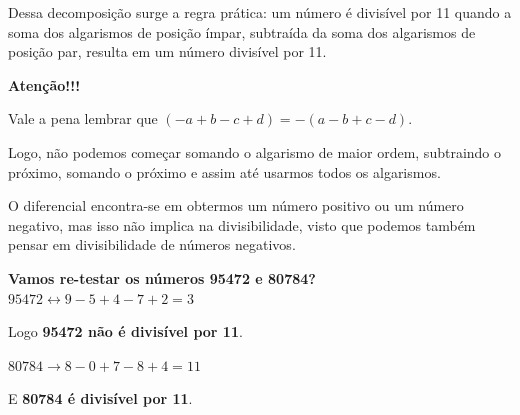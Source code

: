 \documentclass[12pt,a4paper]{article}
\begin{document}
		Dessa decomposição surge a regra prática: um número é divisível por 11 quando a soma dos algarismos de posição ímpar, subtraída da soma dos algarismos de posição par, resulta em um número divisível por 11.
		
		\begin{meudestaque}
			\textbf{Atenção!!!}
			
			Vale a pena lembrar que $(-a+b-c+d) = - (a-b+c-d)$.
			
			Logo, não podemos começar somando o algarismo de maior ordem, subtraindo o próximo, somando o próximo e assim até usarmos todos os algarismos.
			
			O diferencial encontra-se em obtermos um número positivo ou um número negativo, mas isso não implica na divisibilidade, visto que podemos também pensar em divisibilidade de números negativos.
			
		\end{meudestaque}
		
		\textbf{Vamos re-testar os números 95472 e 80784?}\\
		
		$95472 \longleftrightarrow 9-5+4-7+2 = 3$
		
		Logo \textbf{95472 não é divisível por 11}.
		
		$80784 \longrightarrow 8-0+7-8+4 = 11$
		
		E \textbf{80784 é divisível por 11}.
		
	
\end{document}
